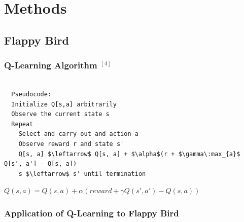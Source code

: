 \documentclass[a4paper, 12pt]{article}
\begin{document}
\par


\section{Methods}


\subsection{Flappy Bird}

\subsubsection{Q-Learning Algorithm $^{[4]}$}

\begin{Parallel}{0.49\textwidth}{0.49\textwidth}
\ParallelPar
\end{Parallel}

\begin{lstlisting}

  Pseudocode:
  Initialize Q[s,a] arbitrarily
  Observe the current state s
  Repeat
    Select and carry out and action a
    Observe reward r and state s'
    Q[s, a] $\leftarrow$ Q[s, a] + $\alpha$(r + $\gamma\:max_{a}$ Q[s', a'] - Q[s, a])
    s $\leftarrow$ s' until termination
\end{lstlisting}

\begin{center}\(Q(s,a) = Q(s,a) + \alpha (reward +  \gamma Q(s',a') - Q(s,a))\)\end{center}

\subsubsection{Application of Q-Learning to Flappy Bird}
\end{document}
